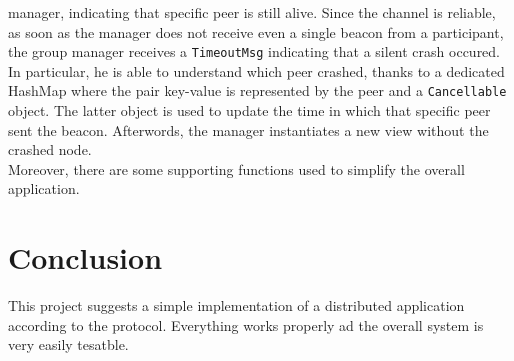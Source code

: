 \documentclass[conference]{IEEEtran}
\begin{document}
manager, indicating that specific peer is still alive. 
Since the channel is reliable, as soon as the manager does not receive 
even a single beacon from a participant, the group manager receives a
\texttt{TimeoutMsg} indicating that a silent crash occured. 
In particular, he is able to understand which peer crashed, thanks to 
a dedicated HashMap where the pair key-value
is represented by the peer and a \texttt{Cancellable} object. The
latter object is used to update the time in which that specific 
peer sent the beacon.
Afterwords, the manager instantiates a new view without the crashed node.\\
Moreover, there are some supporting functions used to simplify the overall
application. 

\section{Conclusion}
This project suggests a simple implementation of a distributed application
according to the protocol. Everything works properly ad the overall system
is very easily tesatble. 

\end{document}
